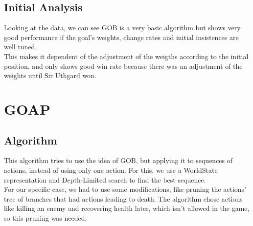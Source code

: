 \documentclass{article}
\begin{document}
  \subsection{Initial Analysis}
  Looking at the data, we can see GOB is a very basic algorithm but shows very good performance if the goal's weights, change rates and initial insistences are well tuned.\\
  This makes it dependent of the adjustment of the weigths according to the initial position, and only shows good win rate because there was an adjustment of the weights
  until Sir Uthgard won. 
  \section{GOAP}
  \subsection{Algorithm}
  This algorithm tries to use the idea of GOB, but applying it to sequences of actions, instead of using only one action. For this, we use a WorldState representation 
  and Depth-Limited search to find the best sequence.\\
  For our specific case, we had to use some modifications, like pruning the actions' tree of branches that had actions leading to death. The algorithm chose actions like killing
  an enemy and recovering health later, which isn't allowed in the game, so this pruning was needed.
\end{document}
